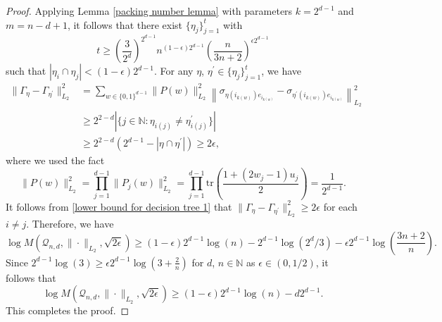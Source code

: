 \documentclass{amsbook}
\theoremstyle{definition}
\theoremstyle{remark}
\numberwithin{section}{chapter}
\numberwithin{equation}{chapter}
\newcommand{\1}{\mathbf{1}}
\begin{document}
\begin{proof}
Applying Lemma \ref{packing number lemma} with parameters $k=2^{d-1}$ and $m=n-d+1$, it follows that there exist $\{\eta_{j}\}_{j=1}^{t}$ with
\[
t\geq \left(\frac{3}{2^{d}}\right)^{2^{d-1}}n^{(1-\epsilon)2^{d-1}}\left(\frac{n}{3n+2}\right)^{\epsilon 2^{d-1}}
\]
such that $|\eta_{i}\cap \eta_{j}|<(1-\epsilon)2^{d-1}$. 
 For any $\eta$, $\eta^{\prime}\in \{\eta_{j}\}_{j=1}^{t}$, we have
\begin{equation}\label{lower bound for decision tree 1}
\begin{split}
\|\Gamma_{\eta}-\Gamma_{\eta^{\prime}}\|^{2}_{L_{2}}&=\sum_{w\in \{0,1\}^{d-1}}\|P(w)\|^{2}_{L_{2}}\left\|\sigma_{\eta(i_{k(w)})e_{i_{k(w)}}}-\sigma_{\eta^{\prime}(i_{k(w)})e_{i_{k(w)}}}\right\|^{2}_{L_{2}}\\
&\geq 2^{2-d}|\{j\in \mathbb{N}:\eta_{i(j)}\neq \eta^{\prime}_{i(j)}\}|\\
&\geq 2^{2-d}\left(2^{d-1}-|\eta\cap\eta^{\prime}|\right)\geq 2\epsilon,
\end{split}
\end{equation}
where we used the fact
\[
\|P(w)\|^{2}_{L_{2}}=\prod_{j=1}^{d-1}\|P_j(w)\|^{2}_{L_{2}}=\prod_{j=1}^{d-1}\mathrm{tr}\left(\frac{1+(2w_{j}-1)u_{j}}{2}\right)=\frac{1}{2^{d-1}}.
\]
It follows from \eqref{lower bound for decision tree 1} that $\|\Gamma_{\eta}-\Gamma_{\eta^{\prime}}\|^{2}_{L_{2}}\geq 2\epsilon$ for each $i\neq j$. Therefore, we have
\[
\log M(\mathcal{Q}_{n,d},\|\cdot\|_{L_{2}},\sqrt{2\epsilon})\geq (1-\epsilon)2^{d-1}\log(n)-2^{d-1}\log(2^{d}/3)-\epsilon 2^{d-1}\log\left(\frac{3n+2}{n}\right).
\]
Since $2^{d-1}\log(3)\geq \epsilon 2^{d-1}\log(3+\frac{2}{n})$ for $d$, $n\in \mathbb{N}$ as $\epsilon\in (0,1/2)$, it follows that
\[
\log M(\mathcal{Q}_{n,d},\|\cdot\|_{L_{2}},\sqrt{2\epsilon})\geq (1-\epsilon)2^{d-1}\log(n)-d2^{d-1}.
\]
This completes the proof.
\end{proof}
\end{document}
